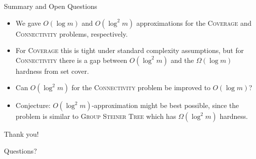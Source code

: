\documentclass[aspectratio=169]{beamer}
\newcommand{\coverage}{\textsc{Coverage}\xspace}
\newcommand{\connectivity}{\textsc{Connectivity}\xspace}
\begin{document}
\begin{frame}{Summary and Open Questions}
  \begin{itemize}
    \item We gave $O(\log m)$ and $O(\log^2 m)$ approximations for the \coverage and \connectivity problems, respectively.
    \pause
    \item For \coverage this is tight under standard complexity assumptions, but for \connectivity there is a gap between $O(\log^2 m)$ and the $\Omega(\log m)$ hardness from set cover.
    \pause
    \item Can $O(\log^2 m)$ for the \connectivity problem be improved to $O(\log m)$?
    \pause
    \item Conjecture: $O(\log^2 m)$-approximation might be best possible, since the problem is similar to \textsc{Group Steiner Tree} which has $\Omega(\log^2 m)$ hardness.
  \end{itemize}
\end{frame}

\begin{frame}
  \centering
  {\Huge Thank you!}

  \vspace{1em}
  Questions?
\end{frame}
\end{document}
